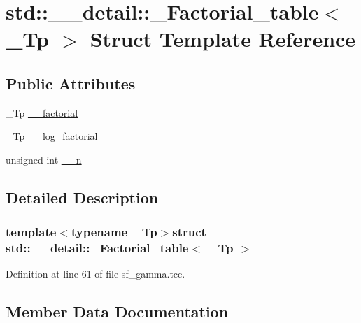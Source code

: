 \hypertarget{structstd_1_1____detail_1_1__Factorial__table}{}\section{std\+:\+:\+\_\+\+\_\+detail\+:\+:\+\_\+\+Factorial\+\_\+table$<$ \+\_\+\+Tp $>$ Struct Template Reference}
\label{structstd_1_1____detail_1_1__Factorial__table}
\subsection*{Public Attributes}
\begin{DoxyCompactItemize}
\item 
\+\_\+\+Tp \hyperlink{structstd_1_1____detail_1_1__Factorial__table_a4e8d20f3fa301037b097bb9f8e5f2060}{\+\_\+\+\_\+factorial}
\item 
\+\_\+\+Tp \hyperlink{structstd_1_1____detail_1_1__Factorial__table_a9d4b412d4d8b46ec660b0441516f412c}{\+\_\+\+\_\+log\+\_\+factorial}
\item 
unsigned int \hyperlink{structstd_1_1____detail_1_1__Factorial__table_ac05bdbe9d5090f0aa53adf8a3f8e3a45}{\+\_\+\+\_\+n}
\end{DoxyCompactItemize}


\subsection{Detailed Description}
\subsubsection*{template$<$typename \+\_\+\+Tp$>$struct std\+::\+\_\+\+\_\+detail\+::\+\_\+\+Factorial\+\_\+table$<$ \+\_\+\+Tp $>$}



Definition at line 61 of file sf\+\_\+gamma.\+tcc.



\subsection{Member Data Documentation}
\hypertarget{structstd_1_1____detail_1_1__Factorial__table_a4e8d20f3fa301037b097bb9f8e5f2060}{}
